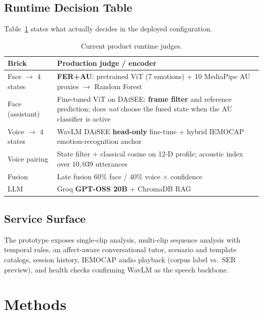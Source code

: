 \documentclass[conference]{IEEEtran}
\begin{document}
\subsection{Runtime Decision Table}
Table~\ref{tab:runtime} states what actually decides in the deployed
configuration.

\begin{table}[!t]
\caption{Current product runtime judges.}
\label{tab:runtime}
\centering
\begin{tabular}{@{}p{}p{}@{}}
\toprule
\textbf{Brick} & \textbf{Production judge / encoder} \\
\midrule
Face $\rightarrow$ 4 states &
\textbf{FER+AU}: pretrained ViT (7 emotions) + 10 MediaPipe AU proxies
$\rightarrow$ Random Forest \\
Face (assistant) &
Fine-tuned ViT on \textsc{DAiSEE}: \textbf{frame filter} and reference
prediction; does \emph{not} choose the fused state when the AU classifier
is active \\
Voice $\rightarrow$ 4 states &
WavLM DAiSEE \textbf{head-only} fine-tune + hybrid IEMOCAP emotion-recognition
anchor \\
Voice pairing &
State filter + classical cosine on 12-D profile; acoustic index over
$10{,}039$ utterances \\
Fusion &
Late fusion $60\%$ face / $40\%$ voice $\times$ confidence \\
LLM &
Groq \textbf{GPT-OSS 20B} + ChromaDB RAG \\
\bottomrule
\end{tabular}
\end{table}

\subsection{Service Surface}
The prototype exposes single-clip analysis, multi-clip sequence analysis with
temporal rules, an affect-aware conversational tutor, scenario and template
catalogs, session history, IEMOCAP audio playback (corpus label vs.\ SER
preview), and health checks confirming WavLM as the speech backbone.

\section{Methods}
\label{sec:methods}
\end{document}
